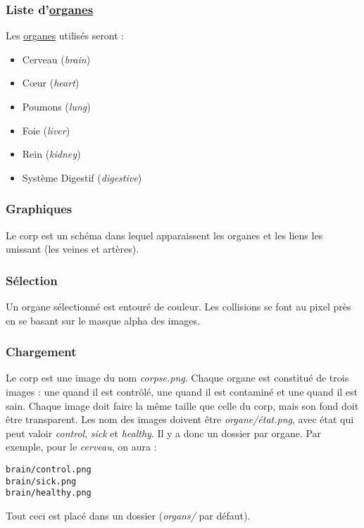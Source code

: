 \documentclass{article}
\begin{document}
\subsubsection{Liste d'\hyperref[organe]{organes}}
Les \hyperref[organe]{organes} utilisés seront :
\begin{itemize}
	\item Cerveau (\emph{brain})
	\item Cœur (\emph{heart})
	\item Poumons (\emph{lung})
	\item Foie (\emph{liver})
	\item Rein (\emph{kidney})
	\item Système Digestif (\emph{digestive})
\end{itemize}

\subsubsection{Graphiques}
Le corp est un schéma dans lequel apparaissent les organes et les liens les unissant (les veines et artères).

\subsubsection{Sélection}
Un organe sélectionné est entouré de couleur. Les collisions se font au pixel près en se basant sur le masque alpha des images.

\subsubsection{Chargement}
Le corp est une image du nom \emph{corpse.png}. Chaque organe est constitué de trois images : une quand il est contrôlé, une quand il est contaminé et une quand il est sain. Chaque image doit faire la même taille que celle du corp, mais son fond doit être transparent. Les nom des images doivent être \emph{organe/état.png}, avec état qui peut valoir \emph{control}, \emph{sick} et \emph{healthy}. Il y a donc un dossier par organe.
Par exemple, pour le \emph{cerveau}, on aura :
\begin{verbatim}
brain/control.png
brain/sick.png
brain/healthy.png
\end{verbatim}
Tout ceci est placé dans un dossier (\emph{organs/} par défaut).
\end{document}

